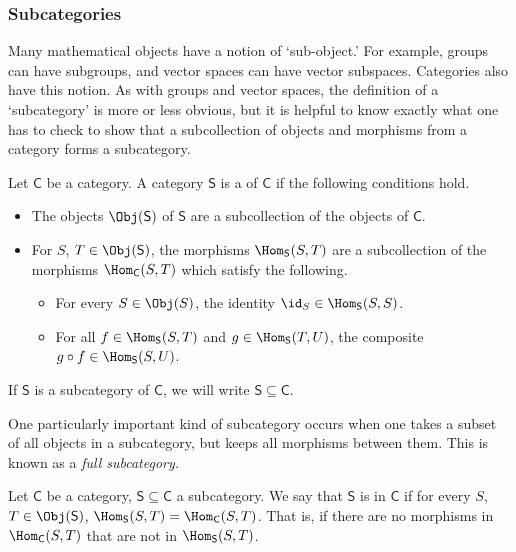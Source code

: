 \documentclass[notes.tex]{subfiles}
\begin{document}
\subsubsection{Subcategories}

Many mathematical objects have a notion of `sub-object.' For example, groups can have subgroups, and vector spaces can have vector subspaces. Categories also have this notion. As with groups and vector spaces, the definition of a `subcategory' is more or less obvious, but it is helpful to know exactly what one has to check to show that a subcollection of objects and morphisms from a category forms a subcategory.

\begin{definition}[subcategory]
  \label{def:subcategory}
  Let $\mathsf{C}$ be a category. A category $\mathsf{S}$ is a  of $\mathsf{C}$ if the following conditions hold.
  \begin{itemize}
    \item The objects $\Obj(\mathsf{S})$ of $\mathsf{S}$ are a subcollection of the objects of $\mathsf{C}$.

    \item For $S$, $T \in \Obj(\mathsf{S})$, the morphisms $\Hom_{\mathsf{S}}(S, T)$ are a subcollection of the morphisms $\Hom_{\mathsf{C}}(S, T)$ which satisfy the following.
      \begin{itemize}
        \item For every $S \in \Obj(S)$, the identity $\id_{S} \in \Hom_{\mathsf{S}}(S, S)$.

        \item For all $f \in \Hom_{\mathsf{S}}(S, T)$ and $g \in \Hom_{\mathsf{S}}(T, U)$, the composite $g \circ f \in \Hom_{\mathsf{S}}(S, U)$.
      \end{itemize}
  \end{itemize}

  If $\mathsf{S}$ is a subcategory of $\mathsf{C}$, we will write $\mathsf{S} \subseteq \mathsf{C}$.
\end{definition}

One particularly important kind of subcategory occurs when one takes a subset of all objects in a subcategory, but keeps all morphisms between them. This is known as a \emph{full subcategory.}

\begin{definition}
  \label{def:fullsubcategory}
  Let $\mathsf{C}$ be a category, $\mathsf{S} \subseteq \mathsf{C}$ a subcategory. We say that $\mathsf{S}$ is  in $\mathsf{C}$ if for every $S$, $T \in \Obj(\mathsf{S})$, $\Hom_{\mathsf{S}}(S, T) = \Hom_{\mathsf{C}}(S, T)$. That is, if there are no morphisms in $\Hom_{\mathsf{C}}(S, T)$ that are not in $\Hom_{\mathsf{S}}(S, T)$.
\end{definition}
\end{document}
